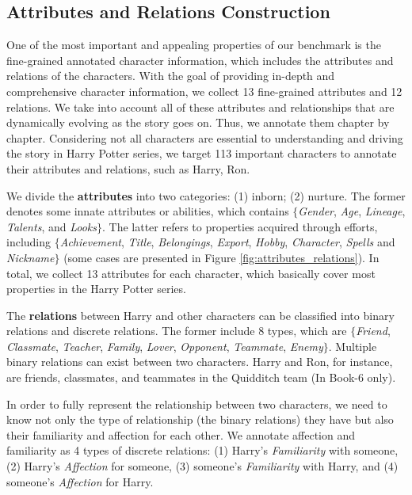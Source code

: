 \documentclass[11pt]{article}
\begin{document}
\subsection{Attributes and Relations Construction}
\label{personas}
One of the most important and appealing properties of our benchmark is the fine-grained annotated character information, which includes the attributes and relations of the characters. With the goal of providing in-depth and comprehensive character information, we collect 13 fine-grained attributes and 12 relations. We take into account all of these attributes and relationships that are dynamically evolving as the story goes on. Thus, we annotate them chapter by chapter. Considering not all characters are essential to understanding and driving the story in Harry Potter series, we target 113 important characters to annotate their attributes and relations, such as Harry, Ron.



We divide the \textbf{attributes} into two categories: (1) inborn; (2) nurture. The former denotes some innate attributes or abilities, which contains $\{$\textit{Gender}, \textit{Age}, \textit{Lineage}, \textit{Talents}, and \textit{Looks}$\}$. The latter refers to properties acquired through efforts, including  $\{$\textit{Achievement}, \textit{Title}, \textit{Belongings}, \textit{Export},  \textit{Hobby}, \textit{Character}, \textit{Spells} and \textit{Nickname}$\}$ (some cases are presented in Figure \ref{fig:attributes_relations}). In total, we collect 13 attributes for each character, which basically cover most properties in the Harry Potter series. 




The \textbf{relations} between Harry and other characters can be classified into binary relations and discrete relations. The former include 8 types, which are $\{$\textit{Friend}, \textit{Classmate}, \textit{Teacher}, \textit{Family}, \textit{Lover}, \textit{Opponent},  \textit{Teammate}, \textit{Enemy}$\}$. Multiple binary relations can exist between two characters. Harry and Ron, for instance, are friends, classmates, and teammates in the Quidditch team (In Book-6 only). 

In order to fully represent the relationship between two characters, we need to know not only the type of relationship (the binary relations) they have but also their familiarity and affection for each other. We annotate affection and familiarity as 4 types of discrete relations: (1) Harry's \textit{Familiarity} with someone, (2) Harry's \textit{Affection} for someone, (3) someone's \textit{Familiarity} with Harry, and (4) someone's \textit{Affection} for Harry. 
\end{document}
